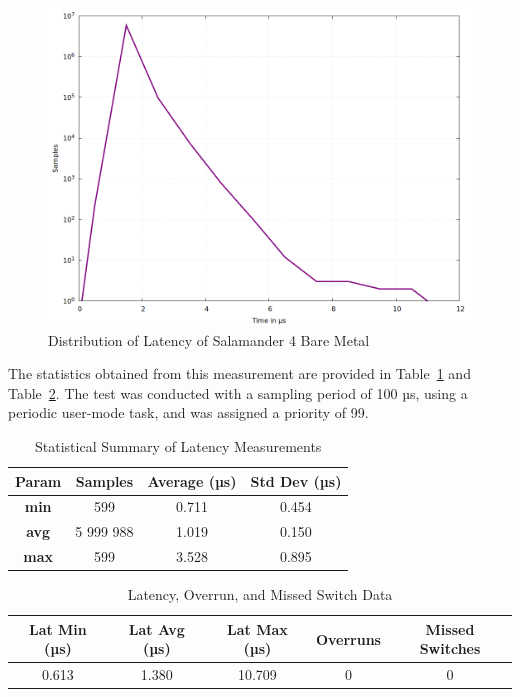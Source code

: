 \documentclass[MMR,Master,english]{twbook}
\begin{document}
\begin{figure}[H]
	\centering
	\includegraphics[width=0.7\columnwidth]{masterthesis-documentation/docs/sigmatek/xenomai/0hardware/gnuplot_max_latency_hardware.png}
	\caption[Distribution of Latency of Salamander 4 Bare Metal]{Distribution of Latency of Salamander 4 Bare Metal}
	\label{fig:gnuplot_max_latency_hardware}
\end{figure}

\noindent The statistics obtained from this measurement are provided in Table~\ref{tab:latency_stats_hardware} and Table~\ref{tab:latency_overrun_msw_hardware}. The test was conducted with a sampling period of 100 µs, using a periodic user-mode task, and was assigned a priority of 99.

\vspace{2em}
\begin{table}[H]
\centering
\begin{tabular}{|c|c|c|c|}
\hline
\textbf{Param} & \textbf{Samples} & \textbf{Average (µs)} & \textbf{Std Dev (µs)} \\ \hline
\textbf{min} & 599 & 0.711 & 0.454 \\ \hline
\textbf{avg} & 5 999 988 & 1.019 & 0.150 \\ \hline
\textbf{max} & 599 & 3.528 & 0.895 \\ \hline
\end{tabular}
\caption{Statistical Summary of Latency Measurements}
\label{tab:latency_stats_hardware}
\end{table}

\vspace{1em}
\begin{table}[H]
	\centering
	\begin{tabular}{|c|c|c|c|c|}
	\hline
	\textbf{Lat Min (µs)} & \textbf{Lat Avg (µs)} & \textbf{Lat Max (µs)} & \textbf{Overruns} & \textbf{Missed Switches} \\ \hline
	0.613 & 1.380 & 10.709 & 0 & 0 \\ \hline
	\end{tabular}
	\caption{Latency, Overrun, and Missed Switch Data}
	\label{tab:latency_overrun_msw_hardware}
	\end{table}
	
\end{document}
